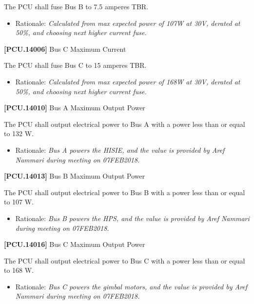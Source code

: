 \documentclass[12pt,oneside,oldfontcommands]{memoir}
\begin{document}
The \gls{PCU} shall fuse Bus B to 7.5 amperes TBR\label{tbx_6}.

\begin{itemize}
\item{} Rationale: \emph{Calculated from max expected power of 107W at 30V, derated at 50\%, and choosing next higher current fuse.}

\end{itemize}

\textbf{[PCU.14006]} Bus C Maximum Current

The \gls{PCU} shall fuse Bus C to 15 amperes TBR\label{tbx_7}.

\begin{itemize}
\item{} Rationale: \emph{Calculated from max expected power of 168W at 30V, derated at 50\%, and choosing next higher current fuse.}

\end{itemize}

\textbf{[PCU.14010]} Bus A Maximum Output Power

The \gls{PCU} shall output electrical power to Bus A with a power less than or equal to 132 W.

\begin{itemize}
\item{} Rationale: \emph{Bus A powers the HISIE, and the value is provided by Aref Nammari during meeting on 07FEB2018.}

\end{itemize}

\textbf{[PCU.14013]} Bus B Maximum Output Power

The \gls{PCU} shall output electrical power to Bus B with a power less than or equal to 107 W.

\begin{itemize}
\item{} Rationale: \emph{Bus B powers the HPS, and the value is provided by Aref Nammari during meeting on 07FEB2018.}

\end{itemize}

\textbf{[PCU.14016]} Bus C Maximum Output Power

The \gls{PCU} shall output electrical power to Bus C with a power less than or equal to 168 W.

\begin{itemize}
\item{} Rationale: \emph{Bus C powers the gimbal motors, and the value is provided by Aref Nammari during meeting on 07FEB2018.}

\end{itemize}
\end{document}
